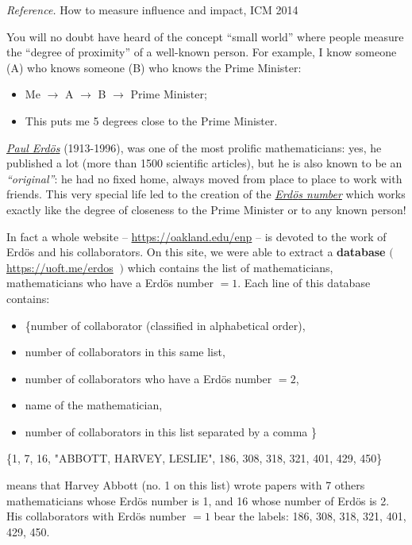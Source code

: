 \emph{Reference.} How to measure influence and impact, ICM 2014


You will no doubt have heard of the concept ``small world'' where people measure the ``degree of proximity'' of a well-known person. 
For example, I know someone (A) who knows someone (B) who knows  the Prime Minister:
\begin{itemize}
	\item Me $\to$ A $\to$ B $\to$ Prime Minister;
	\item This puts me 5 degrees close to the Prime Minister.
\end{itemize}



\href{https://www.wikipedia.org/wiki/Paul_Erdos}{\emph{Paul Erd{\"o}s}} (1913-1996), was one of the most prolific mathematicians: yes, he published a lot (more than 1500 scientific articles), but he is also known to be an \emph{``original''}: he had no fixed home, always moved from place to place to work with friends. This very special life led to the creation of the \href{https://www.wikipedia.org/wiki/Erdos_number}{\emph{Erd{\"o}s number}} which works exactly like the degree of closeness to the Prime Minister or to any known person! 

\begin{emphbox}[]
In fact a whole website -- \url{https://oakland.edu/enp} -- is devoted to the work of Erd{\"o}s and his collaborators. On this site, we were able to extract a \textbf{\color{Green}database} $\bigg($\url{https://uoft.me/erdos} $\ \bigg)$ which contains the list of mathematicians, mathematicians who have a Erd{\"o}s number $= 1$. Each line of this database contains:
\begin{itemize}
	\item \{number of collaborator (classified in alphabetical order),
	\item number of collaborators in this same list,
	\item number of collaborators who have a Erd{\"o}s number $= 2$,
	\item name of the mathematician, 
	\item number of collaborators in this list separated by a comma \}
\end{itemize}
\end{emphbox}

\begin{example}
\hfil \{1, 7, 16, "ABBOTT, HARVEY, LESLIE", 186, 308, 318, 321, 401, 429, 450\}

means that Harvey Abbott (no. 1 on this list) wrote papers with 7 others mathematicians whose Erd{\"o}s number is 1, and 16 whose number of Erd{\"o}s is 2. His collaborators with Erd{\"o}s number $= 1$ bear the labels: 186, 308, 318, 321, 401, 429, 450. 
\end{example}

